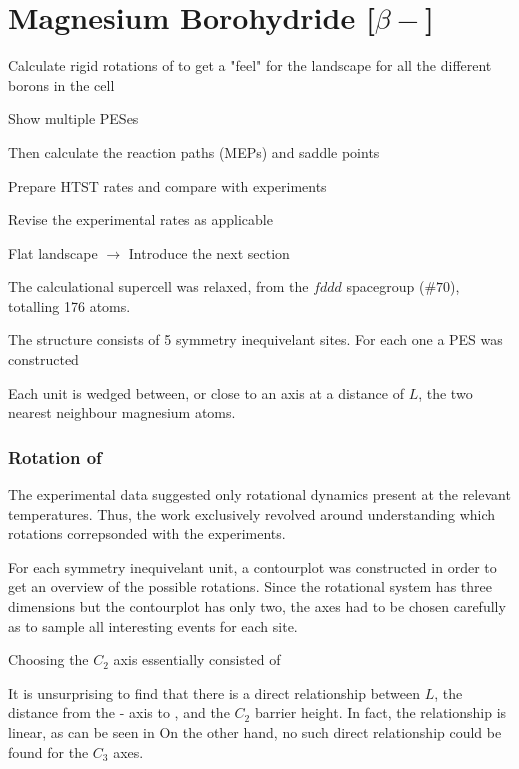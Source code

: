 \section{Magnesium Borohydride [$\beta-$]}
\label{sec:borohydrides-magnesium}

\bit
\item Calculate rigid rotations of  to get a "feel" for the landscape for all the different borons in the cell
\item Show multiple PESes
\item Then calculate the reaction paths (MEPs) and saddle points
\item Prepare HTST rates and compare with experiments
\item Revise the experimental rates as applicable
\item Flat landscape $\rightarrow$ Introduce the next section
\eit

The calculational supercell was relaxed, from the  $fddd$ spacegroup ($\#70$), totalling 176 atoms.

The structure consists of 5 symmetry inequivelant  sites.
For each one a PES was constructed




Each  unit is wedged between, or close to an axis at a distance of $L$, the two nearest neighbour magnesium atoms. \expand

\subsubsection{Rotation of }
The experimental data suggested only rotational dynamics present at the relevant temperatures.
Thus, the work exclusively revolved around understanding which rotations correpsonded with the experiments.

For each symmetry inequivelant  unit, a contourplot was constructed in order to get an overview of the possible rotations.
Since the rotational system has three dimensions but the contourplot has only two, the axes had to be chosen carefully as to sample all interesting events for each site.


Choosing the $C_2$ axis essentially consisted of

It is unsurprising to find that there is a direct relationship between $L$, the distance from the - axis to , and the $C_2$ barrier height.
In fact, the relationship is linear, as can be seen in %
On the other hand, no such direct relationship could be found for the $C_3$ axes.


\incomplete
